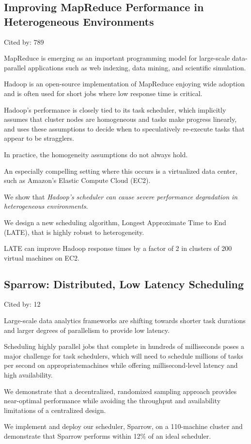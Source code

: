 \documentclass[a4paper,11pt]{article}
\begin{document}
\subsection*{Improving MapReduce Performance in Heterogeneous Environments}
{\color{cyan} {\color{magenta} Cited by: 789}

MapReduce is emerging as an important programming model 
for large-scale data-parallel applications such as
web indexing, data mining, and scientific simulation.

Hadoop is an open-source implementation of MapReduce enjoying wide adoption and is 
often used for short jobs where low response time is critical. 

Hadoop's performance is closely tied to its task scheduler, 
which implicitly assumes that 
cluster nodes are homogeneous and tasks make progress linearly, and 
uses these assumptions to decide when to speculatively re-execute tasks that appear to be stragglers. 

In practice, 
the homogeneity assumptions do not always hold. 

An especially compelling setting where this occurs is a virtualized data center, 
such as Amazon's Elastic Compute Cloud (EC2).

We show that 
{\em Hadoop's scheduler can cause 
severe performance degradation in heterogeneous environments}. 

We design
a new scheduling algorithm, 
{\color{black} Longest Approximate Time to End (LATE)\cite{late}}, 
that is highly robust to heterogeneity.

LATE can improve Hadoop response times 
by a factor of 2 
in clusters of 200 virtual machines on EC2.	

}

\subsection*{Sparrow: Distributed, Low Latency Scheduling}
{\color{cyan} {\color{magenta} Cited by: 12}

Large-scale data analytics frameworks are 
shifting towards shorter task durations and larger degrees of parallelism to provide low latency. 

Scheduling highly parallel jobs that 
complete in hundreds of milliseconds poses a major 
challenge for task schedulers, 
which will need to
schedule millions of tasks per second on appropriatemachines
while offering millisecond-level latency and high availability. 

We demonstrate that a 
decentralized, randomized sampling approach provides near-optimal performance
while avoiding the throughput and availability limitations of a centralized design. 

We implement and deploy our scheduler, 
{\color{black} Sparrow\cite{sparrow}}, 
on a 110-machine cluster and 
demonstrate that Sparrow performs within 12\% of an ideal scheduler.

}
\end{document}
